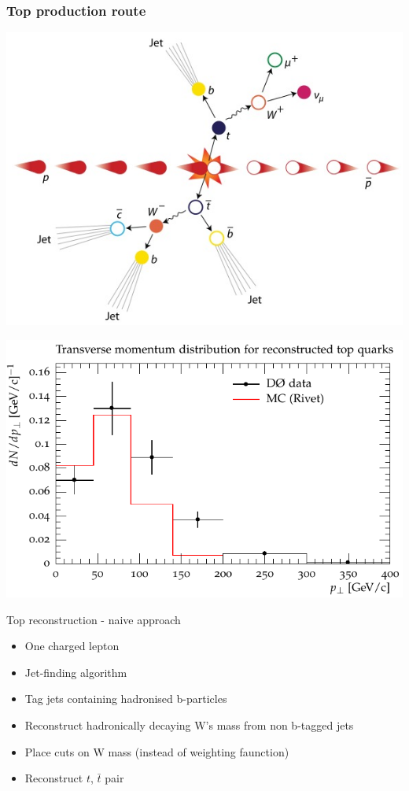 \documentclass{beamer}
\begin{document}
  \begin{frame}
    \frametitle{Top production route}
    \includegraphics[height=0.89\textheight]{ttbar.jpg}
  \end{frame}

  \begin{frame}
    \includegraphics[width=\textwidth]{top_paper}
  \end{frame}

  \begin{frame}{Top reconstruction - naive approach}
    \begin{itemize}[<uncover@+>]
      \item One charged lepton
      \item Jet-finding algorithm
      \item Tag jets containing hadronised b-particles 
      \item Reconstruct hadronically decaying W's mass from non b-tagged jets
      \item Place cuts on W mass (instead of weighting faunction)
      \item Reconstruct $t$, $\bar{t}$ pair
    \end{itemize}
  \end{frame}
\end{document}
